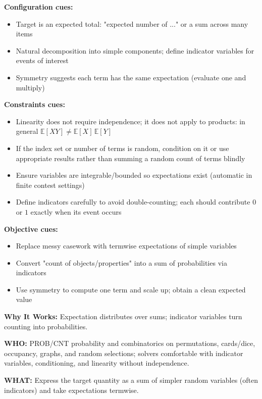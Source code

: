 \documentclass[12pt]{article}
\begin{document}
\textbf{Configuration cues:}
\begin{itemize}
    \item Target is an expected total: "expected number of ..." or a sum across many items
    \item Natural decomposition into simple components; define indicator variables for events of interest
    \item Symmetry suggests each term has the same expectation (evaluate one and multiply)
\end{itemize}

\textbf{Constraints cues:}
\begin{itemize}
    \item Linearity does not require independence; it does not apply to products: in general $\mathbb{E}[XY] \ne \mathbb{E}[X] \, \mathbb{E}[Y]$
    \item If the index set or number of terms is random, condition on it or use appropriate results rather than summing a random count of terms blindly
    \item Ensure variables are integrable/bounded so expectations exist (automatic in finite contest settings)
    \item Define indicators carefully to avoid double-counting; each should contribute $0$ or $1$ exactly when its event occurs
\end{itemize}

\textbf{Objective cues:}
\begin{itemize}
    \item Replace messy casework with termwise expectations of simple variables
    \item Convert "count of objects/properties" into a sum of probabilities via indicators
    \item Use symmetry to compute one term and scale up; obtain a clean expected value
\end{itemize}

\textbf{Why It Works:} Expectation distributes over sums; indicator variables turn counting into probabilities.

\textbf{WHO:} PROB/CNT probability and combinatorics on permutations, cards/dice, occupancy, graphs, and random selections; solvers comfortable with indicator variables, conditioning, and linearity without independence.

\textbf{WHAT:} Express the target quantity as a sum of simpler random variables (often indicators) and take expectations termwise.
\end{document}
